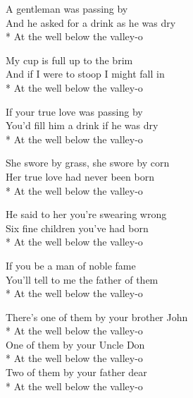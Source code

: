 


\contd
{}

\versemark
A gentleman was passing by\\
And he asked for a drink as he was dry\\*
\vin At the well below the valley-o 

\versemark
My cup is full up to the brim\\
And if I were to stoop I might fall in\\*
\vin At the well below the valley-o 

\versemark
If your true love was passing by\\
You’d fill him a drink if he was dry\\*
\vin At the well below the valley-o 

\versemark
She swore by grass, she swore by corn\\
Her true love had never been born\\*
\vin At the well below the valley-o 

\versemark
He said to her you’re swearing wrong\\
Six fine children you’ve had born\\*
\vin At the well below the valley-o 

\versemark
If you be a man of noble fame\\
You’ll tell to me the father of them\\*
\vin At the well below the valley-o 

\versemark
There’s one of them by your brother John\\*
\vin At the well below the valley-o\\
One of them by your Uncle Don\\*
\vin At the well below the valley-o\\
Two of them by your father dear\\*
\vin At the well below the valley-o 

